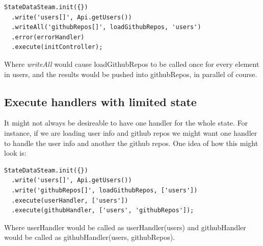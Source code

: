 \documentclass[a4paper,12pt]{article}
\begin{document}
\begin{lstlisting}[caption=Executing the stream, frame=single]
StateDataSteam.init({})
  .write('users[]', Api.getUsers())
  .writeAll('githubRepos[]', loadGithubRepos, 'users')
  .error(errorHandler)
  .execute(initController);
\end{lstlisting}
Where \emph{writeAll} would cause loadGithubRepos to be called once for every element in users, and the results would be pushed into githubRepos, in parallel of course.

\subsection{Execute handlers with limited state}
It might not always be desireable to have one handler for the whole state. For instance, if we are loading user info and github repos we might want one handler to
handle the user info and another the github repos. One idea of how this might look is:

\begin{lstlisting}[caption=Executing the stream, frame=single]
StateDataSteam.init({})
  .write('users[]', Api.getUsers())
  .write('githubRepos[]', loadGithubRepos, ['users'])
  .execute(userHandler, ['users'])
  .execute(githubHandler, ['users', 'githubRepos']);
\end{lstlisting}

Where userHandler would be called as userHandler(users) and githubHandler would be called as githubHandler(users, githubRepos).
\end{document}
